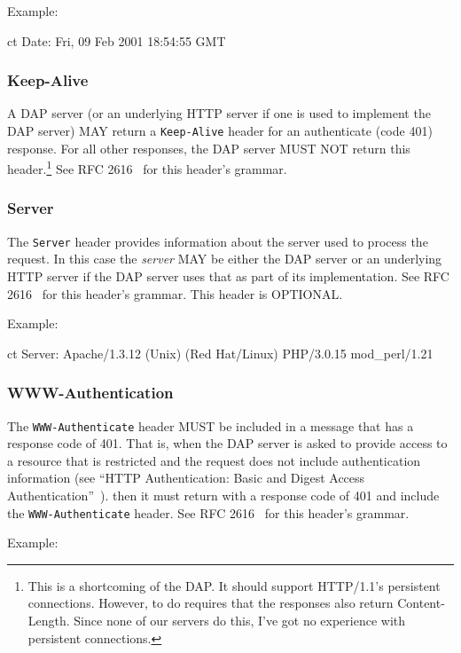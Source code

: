 \documentclass{article}
\begin{document}
Example:
\begin{vcode}{ct}
Date: Fri, 09 Feb 2001 18:54:55 GMT
\end{vcode}

\subsubsection{Keep-Alive}
A \ac{DAP} server (or an underlying \ac{HTTP} server if one is used to
implement the \ac{DAP} server) MAY return a \texttt{Keep-Alive} header for an
authenticate (code 401) response. For all other responses, the \ac{DAP}
server MUST NOT return this header.\footnote{This is a shortcoming of the
  \ac{DAP}. It should support HTTP/1.1's persistent connections. However, to
  do requires that the responses also return Content-Length. Since none of our
  servers do this, I've got no experience with persistent connections.} See
RFC 2616~\cite{rfc2616} for this header's grammar.

\subsubsection{Server}
The \texttt{Server} header provides information about the server used to
process the request. In this case the \emph{server} MAY be either the
\ac{DAP} server or an underlying \ac{HTTP} server if the \ac{DAP} server uses
that as part of its implementation. See RFC 2616~\cite{rfc2616}
for this header's grammar. This header is OPTIONAL.

Example:

\begin{vcode}{ct}
Server: Apache/1.3.12 (Unix)  (Red Hat/Linux) PHP/3.0.15 mod\_perl/1.21
\end{vcode}

\subsubsection{WWW-Authentication}
The \texttt{WWW-Authenticate} header MUST be included in a message that has a
response code of 401. That is, when the \ac{DAP} server is asked to provide
access to a resource that is restricted and the request does not include
authentication information (see ``HTTP Authentication: Basic and Digest
Access Authentication''~\cite{rfc2617}). then it must return with a response
code of 401 and include the \texttt{WWW-Authenticate} header. See RFC
2616~\cite{rfc2616} for this header's grammar.

Example:
\end{document}
